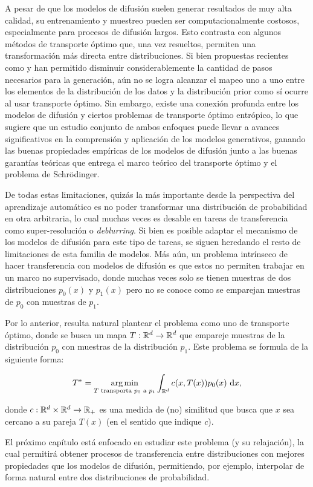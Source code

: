 A pesar de que los modelos de difusión suelen generar resultados de muy alta calidad, su entrenamiento y muestreo pueden ser computacionalmente costosos, especialmente para procesos de difusión largos. Esto contrasta con algunos métodos de transporte óptimo que, una vez resueltos, permiten una transformación más directa entre distribuciones. Si bien propuestas recientes como \cite{song2023consistencymodels} y \cite{salimans2022progressivedistillationfastsampling} han permitido disminuir considerablemente la cantidad de pasos necesarios para la generación, aún no se logra alcanzar el mapeo uno a uno entre los elementos de la distribución de los datos y la distribución prior como sí ocurre al usar transporte óptimo. Sin embargo, existe una conexión profunda entre los modelos de difusión y ciertos problemas de transporte óptimo entrópico, lo que sugiere que un estudio conjunto de ambos enfoques puede llevar a avances significativos en la comprensión y aplicación de los modelos generativos, ganando las buenas propiedades empíricas de los modelos de difusión junto a las buenas garantías teóricas que entrega el marco teórico del transporte óptimo y el problema de Schrödinger.

De todas estas limitaciones, quizás la más importante desde la perspectiva del aprendizaje automático es no poder transformar una distribución de probabilidad en otra arbitraria, lo cual muchas veces es desable en tareas de transferencia como super-resolución o \textit{deblurring}. Si bien es posible adaptar el mecanismo de los modelos de difusión para este tipo de tareas, se siguen heredando el resto de limitaciones de esta familia de modelos. Más aún, un problema intrínseco de hacer transferencia con modelos de difusión es que estos no permiten trabajar en un marco no supervisado, donde muchas veces solo se tienen muestras de dos distribuciones $p_0(x)$ y $p_1(x)$ pero no se conoce como se emparejan muestras de $p_0$ con muestras de $p_1$.

Por lo anterior, resulta natural plantear el problema como uno de transporte óptimo, donde se busca un mapa $T:\mathbb{R}^d\to\mathbb{R}^d$ que empareje muestras de la distribución $p_0$ con muestras de la distribución $p_1$. Este problema se formula de la siguiente forma:

\begin{equation*}
    T^* = \operatorname*{arg\,min}_{T\text{ transporta $p_0$ a $p_1$}} \int_{\mathbb{R}^d} c(x,T(x)) p_0(x)\,\operatorname{d}\! x ,
\end{equation*}

donde $c:\mathbb{R}^d\times\mathbb{R}^d\to\mathbb{R}_+$ es una medida de (no) similitud que busca que $x$ sea cercano a su pareja $T(x)$ (en el sentido que indique $c$).

El próximo capítulo está enfocado en estudiar este problema (y su relajación), la cual permitirá obtener procesos de transferencia entre distribuciones con mejores propiedades que los modelos de difusión, permitiendo, por ejemplo, interpolar de forma natural entre dos distribuciones de probabilidad.